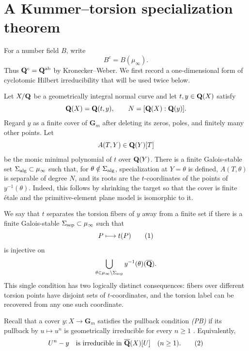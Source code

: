 \section{A Kummer--torsion specialization theorem}
\label{sec:abstract-specialization}

For a number field $B$, write
\[
 B^c=B(\mu_\infty).
\]
Thus $\mathbf Q^c=\mathbf Q^{\mathrm{ab}}$ by Kronecker--Weber.  We first record a
one-dimensional form of cyclotomic Hilbert irreducibility that will be
used twice below.

Let $X/\mathbf Q$ be a geometrically integral normal curve and let
$t,y\in\mathbf Q(X)$ satisfy
\[
 \mathbf Q(X)=\mathbf Q(t,y),\qquad
 N=[\mathbf Q(X):\mathbf Q(y)].
\]
Regard $y$ as a finite cover of $\mathbf G_m$ after deleting its zeros,
poles, and finitely many other points.  Let
\[
 A(T,Y)\in\mathbf Q(Y)[T]
\]
be the monic minimal polynomial of $t$ over $\mathbf Q(Y)$.  There is a finite
Galois-stable set $\Sigma_{\rm alg}\subset\mu_\infty$ such that, for
$\theta\notin\Sigma_{\rm alg}$, specialization at $Y=\theta$ is
defined, $A(T,\theta)$ is separable of degree $N$, and its roots are
the $t$-coordinates of the points of $y^{-1}(\theta)$.  Indeed, this
follows by shrinking the target so that the cover is finite \'etale and
the primitive-element plane model is isomorphic to it.

We say that $t$ separates the torsion fibers of $y$ away from a finite
set if there is a finite Galois-stable
$\Sigma_{\rm sep}\subset\mu_\infty$ such that
\[
 P\longmapsto t(P)
 \numberthis\label{eq:torsion-separation}
\]
is injective on
\[
 \bigcup_{\theta\in\mu_\infty\setminus\Sigma_{\rm sep}}
 y^{-1}(\theta)(\overline{\mathbf Q}).
\]
This single condition has two logically distinct consequences: fibers
over different torsion points have disjoint sets of $t$-coordinates,
and the torsion label can be recovered from any one such coordinate.

Recall that a cover $y:X\to\mathbf G_m$ satisfies the pullback
condition \emph{(PB)} if its pullback by $u\mapsto u^n$ is geometrically
irreducible for every $n\ge1$ \cite[Definition and Proposition
2.1]{Zannier2010}.  Equivalently,
\[
 U^n-y\quad\hbox{is irreducible in }\overline{\Q}(X)[U]
 \quad(n\ge1).
 \numberthis\label{eq:pb-binomial}
\]

